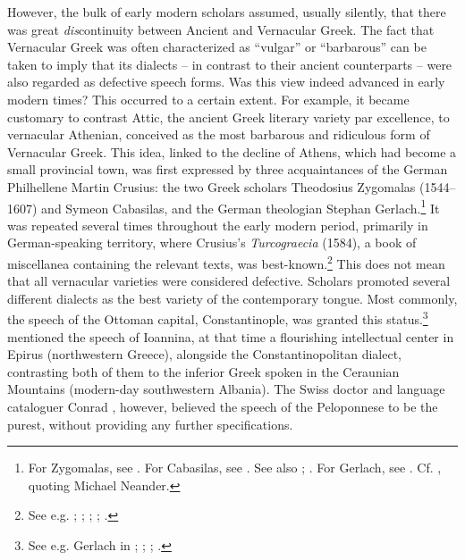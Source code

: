 However, the bulk of early modern scholars assumed, usually silently, that there was great \textit{dis}continuity between Ancient and Vernacular Greek. The fact that Vernacular Greek was often characterized as “vulgar” or “barbarous” can be taken to imply that its dialects – in contrast to their ancient counterparts – were also regarded as defective speech forms. Was this view indeed advanced in early modern times? This occurred to a certain extent. For example, it became customary to contrast Attic, the ancient Greek literary variety par excellence, to vernacular Athenian, conceived as the most barbarous and ridiculous form of Vernacular Greek. This idea, linked to the decline of Athens, which had become a small provincial town, was first expressed by three acquaintances of the German Philhellene Martin Crusius: the two Greek scholars Theodosius Zygomalas (1544–1607) and Symeon Cabasilas, and the German theologian Stephan Gerlach.\footnote{For Zygomalas, see \citet[99, 216]{Crusius1584}. For Cabasilas, see \citet[461]{Crusius1584}. See also \citet[91]{Rotolo1973}; \citet[185, 189–190]{Rhoby2002}. For Gerlach, see \citet[489]{Crusius1584}. Cf. \citet[194]{Ben-tov2013}, quoting Michael Neander.} It was repeated several times throughout the early modern period, primarily in German-speaking territory, where Crusius’s \textit{Turcograecia} (1584), a book of miscellanea containing the relevant texts, was best-known.\footnote{See e.g. \citet[215]{Becman1673}; \citet[\textsc{a.3}\textsc{\textsuperscript{v}}]{Rodigast1685}; \citet[\textsc{ii}.824]{Hofmann1698}; \citet[1135]{[frisch]1730}; \citet[9]{Gedike1782}.} This does not mean that all vernacular varieties were considered defective. Scholars promoted several different dialects as the best variety of the contemporary tongue. Most commonly, the speech of the Ottoman capital, Constantinople, was granted this status.\footnote{See e.g. Gerlach in \citet[489]{Crusius1584}; \citet[215]{Becman1673}; \citet[74]{Blount1680}; \citet[vii]{Du1688}.} \citet[a.4\textsc{\textsuperscript{v}}, a.7\textsc{\textsuperscript{r}}]{Tribbechow1705} mentioned the speech of Ioannina, at that time a flourishing intellectual center in Epirus (northwestern Greece), alongside the Constantinopolitan dialect, contrasting both of them to the inferior Greek spoken in the Ceraunian Mountains (modern-day southwestern Albania). The Swiss doctor and language cataloguer Conrad \citet[47\textsc{\textsuperscript{r}}]{Gessner1555}, however, believed the speech of the Peloponnese to be the purest, without providing any further specifications.

